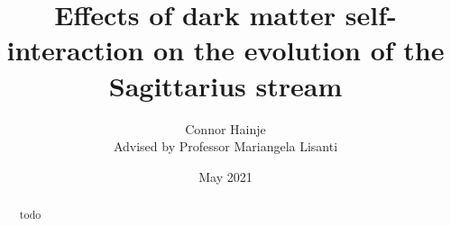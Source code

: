 \documentclass{report}
\title{Effects of dark matter self-interaction on the evolution of the Sagittarius stream}
\author{Connor Hainje\\Advised by Professor Mariangela Lisanti}
\date{May 2021}
\begin{document}
\maketitle

\begin{abstract}
    todo
\end{abstract}

\tableofcontents 

\newpage







% 
% 

\printbibliography
\end{document}
